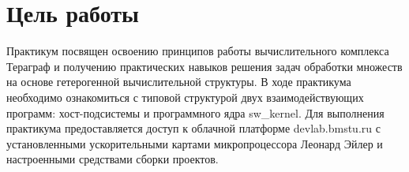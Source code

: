 \chapter*{Цель работы}

Практикум посвящен освоению принципов работы вычислительного комплекса Тераграф и получению практических навыков решения задач обработки множеств на основе гетерогенной вычислительной структуры. В ходе практикума необходимо ознакомиться с типовой структурой двух взаимодействующих программ: хост-подсистемы и программного ядра sw\_kernel. Для выполнения практикума предоставляется доступ к облачной платформе devlab.bmstu.ru с установленными ускорительными картами микропроцессора Леонард Эйлер и настроенными средствами сборки проектов.

